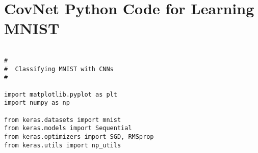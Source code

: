 \documentclass[12pt,journal,compsoc]{IEEEtran}
\begin{document}
\ifCLASSOPTIONcaptionsoff
  \newpage
\fi



\newpage
\onecolumn
\appendices
\section{CovNet Python Code for Learning MNIST}
\label{App:Conv}
\begin{lstlisting}

# 
#  Classifying MNIST with CNNs
# 

import matplotlib.pyplot as plt
import numpy as np

from keras.datasets import mnist
from keras.models import Sequential
from keras.optimizers import SGD, RMSprop
from keras.utils import np_utils

\end{lstlisting}
\end{document}
